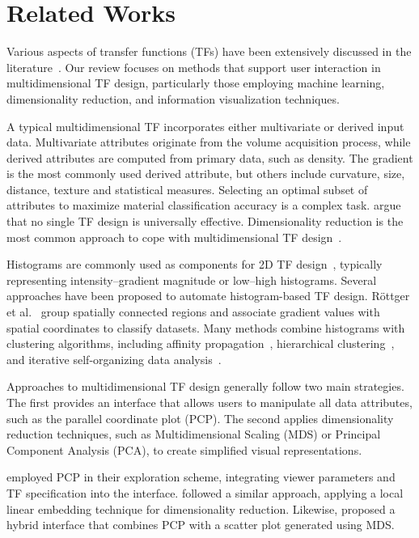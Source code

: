\section{Related Works}
\label{sect:related-works}

Various aspects of transfer functions (TFs) have been extensively discussed in the literature~\cite{ljung2016}. Our review focuses on methods that support user interaction in multidimensional TF design, particularly those employing machine learning, dimensionality reduction, and information visualization techniques.

A typical multidimensional TF incorporates either multivariate or derived input data. Multivariate attributes originate from the volume acquisition process, while derived attributes are computed from primary data, such as density. The gradient is the most commonly used derived attribute, but others include curvature, size, distance, texture and statistical measures. Selecting an optimal subset of attributes to maximize material classification accuracy is a complex task. \cite{arens2010} argue that no single TF design is universally effective. Dimensionality reduction is the most common approach to cope with multidimensional TF design~\cite{cai2017, abbasloo2016, gao2022, moura2007, zhao2010}.

Histograms are commonly used as components for 2D TF design~\cite{kniss2002}, typically representing intensity--gradient magnitude or low--high histograms. Several approaches have been proposed to automate histogram-based TF design. Röttger et al.~\cite{roettger2005} group spatially connected regions and associate gradient values with spatial coordinates to classify datasets. Many methods combine histograms with clustering algorithms, including affinity propagation~\cite{zhang2016}, hierarchical clustering~\cite{sereda2006}, and iterative self-organizing data analysis~\cite{tzeng2004}.

Approaches to multidimensional TF design generally follow two main strategies. The first provides an interface that allows users to manipulate all data attributes, such as the parallel coordinate plot (PCP). The second applies dimensionality reduction techniques, such as Multidimensional Scaling (MDS) or Principal Component Analysis (PCA), to create simplified visual representations.

\cite{tory2005} employed PCP in their exploration scheme, integrating viewer parameters and TF specification into the interface. \cite{zhao2010} followed a similar approach, applying a local linear embedding technique for dimensionality reduction. Likewise,\cite{guo2011} proposed a hybrid interface that combines PCP with a scatter plot generated using MDS.

